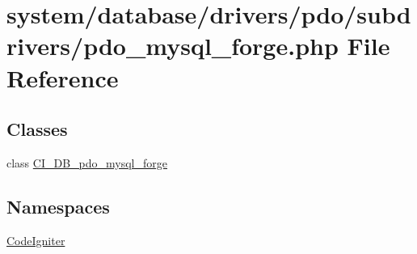 \hypertarget{pdo__mysql__forge_8php}{}\section{system/database/drivers/pdo/subdrivers/pdo\+\_\+mysql\+\_\+forge.php File Reference}
\label{pdo__mysql__forge_8php}
\subsection*{Classes}
\begin{DoxyCompactItemize}
\item 
class \mbox{\hyperlink{class_c_i___d_b__pdo__mysql__forge}{C\+I\+\_\+\+D\+B\+\_\+pdo\+\_\+mysql\+\_\+forge}}
\end{DoxyCompactItemize}
\subsection*{Namespaces}
\begin{DoxyCompactItemize}
\item 
 \mbox{\hyperlink{namespace_code_igniter}{Code\+Igniter}}
\end{DoxyCompactItemize}
